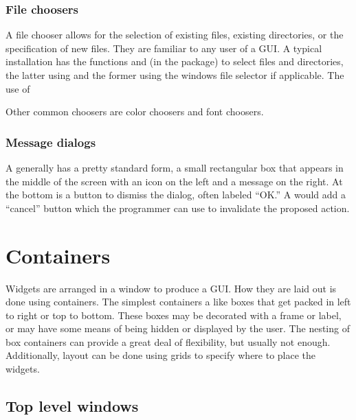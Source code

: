\subsubsection{File choosers}
\label{sec:GUI:file-choosers}

A file chooser allows for the selection of existing files, existing
directories, or the specification of new files. They are familiar to
any user of a GUI. A typical \R\/ installation has the functions
 and  (in the
 package) to select files and directories, the latter using
 and the former using the windows file selector if
applicable. The use of \


Other common choosers are color choosers and font choosers.

\subsubsection{Message dialogs}
\label{sec:GUI:message-dialogs}

A  generally has a pretty standard form, a
small rectangular box that appears in the middle of the screen with an
icon on the left and a message on the right. At the bottom is a button
to dismiss the dialog, often labeled ``OK.'' A  would add a ``cancel'' button which the programmer can use
to invalidate the proposed action.



\section{Containers}
\label{sec:GUI:basic-components-containers}

Widgets are arranged in a window to produce a GUI. How they are laid
out is done using containers. The simplest containers a like boxes
that get packed in left to right or top to bottom. These boxes may be
decorated with a frame or label, or may have some means of being
hidden or displayed by the user. The nesting of box containers can
provide a great deal of flexibility, but usually not
enough. Additionally, layout can be done using grids to specify where
to place the widgets.

\subsection{Top level windows}
\label{sec:GUI:top-level-windows}

